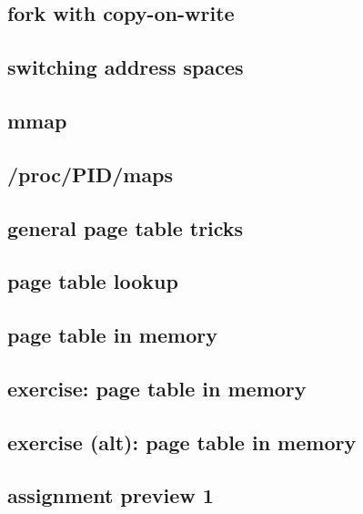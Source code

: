 \subsection{fork with copy-on-write}


\subsection{switching address spaces}


\subsection{mmap}


\subsection{/proc/PID/maps}



\subsection{general page table tricks}


\subsection{page table lookup}


\subsection{page table in memory}



\subsection{exercise: page table in memory}

\subsection{exercise (alt): page table in memory}


\subsection{assignment preview 1}



